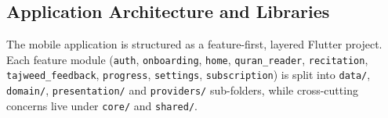 \subsection{Application Architecture and Libraries}
\label{sec:impl_app_arch}

The mobile application is structured as a feature-first, layered Flutter project. Each feature module (\texttt{auth}, \texttt{onboarding}, \texttt{home}, \texttt{quran\_reader}, \texttt{recitation}, \texttt{tajweed\_feedback}, \texttt{progress}, \texttt{settings}, \texttt{subscription}) is split into \texttt{data/}, \texttt{domain/}, \texttt{presentation/} and \texttt{providers/} sub-folders, while cross-cutting concerns live under \texttt{core/} and \texttt{shared/}.

